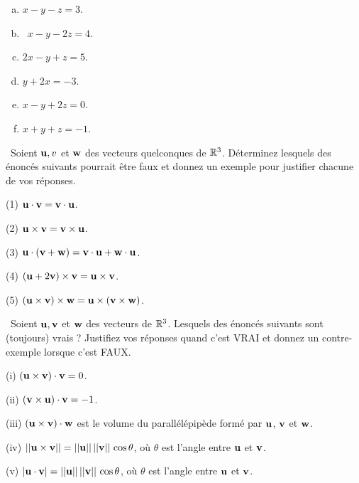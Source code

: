 \begin{prob}
\begin{enumerate}[a)]
\item $x - y - z = 3$.\medskip 
\item\sov~$x - y - 2z = 4$. \medskip
\item $2x - y + z = 5$. \medskip
\item $y + 2x = -3$. \medskip
\item $x - y + 2z = 0$. \medskip
\item $x + y + z = -1$.\medskip
\end{enumerate}


\end{prob} \begin{prob} \label{prob03.8}\sov~Soient $\mathbf{u}, v$ et $\mathbf{w}$ des vecteurs quelconques de $\mathbb{R}^3$.  Déterminez lesquels des énoncés suivants pourrait être faux et donnez un exemple pour justifier chacune de vos réponses.
 \medskip

(1) $\mathbf{u}\cdot \mathbf{v}=\mathbf{v}\cdot \mathbf{u}$.

(2) $\mathbf{u}\times \mathbf{v}=\mathbf{v}\times \mathbf{u}$.

(3) $\mathbf{u}\cdot(\mathbf{v}+\mathbf{w})=\mathbf{v}\cdot \mathbf{u}+\mathbf{w}\cdot \mathbf{u}$.

(4) $(\mathbf{u}+2\mathbf{v})\times \mathbf{v}=\mathbf{u}\times \mathbf{v}$.

(5) $(\mathbf{u}\times \mathbf{v})\times \mathbf{w}=\mathbf{u}\times(\mathbf{v}\times \mathbf{w})$.


\end{prob} \begin{prob} \label{prob03.9}\sov~Soient $\mathbf{u} , \mathbf{v} $ et $\mathbf{w} $ des vecteurs de $\mathbb{R}^3$.  Lesquels des énoncés suivants sont (toujours) vrais ? Justifiez vos réponses quand c'est VRAI et donnez un contre-exemple lorsque c'est FAUX.
\medskip

(i) $(\mathbf{u}\times \mathbf{v})\cdot \mathbf{v}=0$.
 

(ii) $(\mathbf{v} \times \mathbf{u})\cdot \mathbf{v}=-1$.
 

(iii) $(\mathbf{u}\times \mathbf{v})\cdot \mathbf{w}$ est le volume du parallélépipède formé par $\mathbf{u}$, $\mathbf{v}$ et $\mathbf{w}$.
 

(iv) $||\mathbf{u}\times \mathbf{v}||=||\mathbf{u}||\,||\mathbf{v}||\,\cos\theta$,
où $\theta$ est l'angle entre $\mathbf{u}$ et $\mathbf{v}$.
 

(v) $|\mathbf{u}\cdot \mathbf{v}|=||\mathbf{u}||\,||\mathbf{v}||\,\cos\theta$,
où $\theta$ est l'angle entre $\mathbf{u}$ et $\mathbf{v}$.



\end{prob} 


